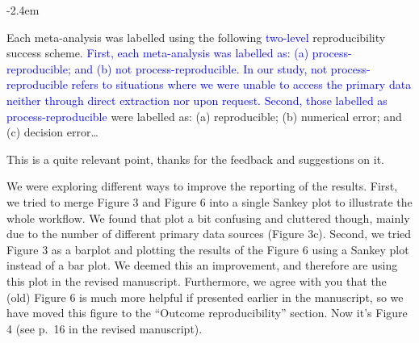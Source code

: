 \documentclass[draft]{article}
\renewenvironment{quote}{\begin{fquote}\advance\leftmargini -2.4em\begin{oldquote}}{\end{oldquote}\end{fquote}}
\newenvironment{fquote}
  {\def\FrameCommand{
	\fboxsep=0.6em %
	\fcolorbox{black}{white}}%
    \MakeFramed {\advance\hsize-2\width \FrameRestore}
    \begin{minipage}{\linewidth}
  }
  {\end{minipage}\endMakeFramed}
\begin{document}
\begin{quote}
Each meta-analysis was labelled using the following \textcolor{blue}{two-level} reproducibility success scheme. \textcolor{blue}{First, each meta-analysis was labelled as: (a) process-reproducible; and (b) not process-reproducible. In our study, not process-reproducible refers to situations where we were unable to access the primary data neither through direct extraction nor upon request. Second, those labelled as process-reproducible} were labelled as: (a) reproducible; (b) numerical error; and (c) decision error\ldots{}
\end{quote}


This is a quite relevant point, thanks for the feedback and suggestions on it.

We were exploring different ways to improve the reporting of the results. First, we tried to merge Figure 3 and Figure 6 into a single Sankey plot to illustrate the whole workflow. We found that plot a bit confusing and cluttered though, mainly due to the number of different primary data sources (Figure 3c). Second, we tried Figure 3 as a barplot and plotting the results of the Figure 6 using a Sankey plot instead of a bar plot. We deemed this an improvement, and therefore are using this plot in the revised manuscript. Furthermore, we agree with you that the (old) Figure 6 is much more helpful if presented earlier in the manuscript, so we have moved this figure to the ``Outcome reproducibility'' section. Now it's Figure 4 (see p.~16 in the revised manuscript).
\end{document}
